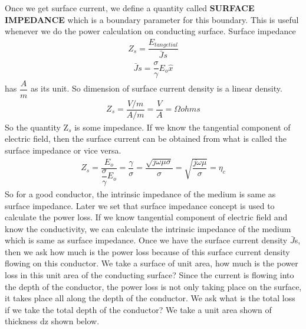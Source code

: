 Once we get surface current, we define a quantity called \textbf{SURFACE IMPEDANCE} which is a boundary parameter for this boundary. This is useful whenever we do the power calculation on conducting surface.
Surface impedance
\begin{align}
Z_{s}=\dfrac{E_{tangetial}}{\bar{J}s}
\end{align}
\begin{align}
\bar{J}s=\dfrac{\sigma}{\gamma}E_{o}\hat{x}
\end{align}
has $\dfrac{A}{m}$ as its unit. So dimension of surface current density is a linear density.
\begin{align}
Z_{s}=\dfrac{V/m}{A/m}=\dfrac{V}{A}=\Omega ohms
\end{align}
So the quantity Z$_{s}$ is some impedance. If we know the tangential component of electric field, then the surface current can be obtained from what is called the surface impedance or vice versa.
\begin{align}
Z_{s}=\dfrac{E_{o}}{\dfrac{\sigma}{\gamma} E_{o}}=\dfrac{\gamma}{\sigma}=\dfrac{\sqrt{j\omega\mu\sigma}}{\sigma}=\sqrt{\dfrac{j\omega\mu}{\sigma}}=\eta_{c}
\end{align}
So for a good conductor, the intrinsic impedance of the medium is same as surface impedance. Later we set that surface impedance concept is used to calculate the power loss. If we know tangential component of electric field and know the conductivity, we can calculate the intrinsic impedance of the medium which is same as surface impedance.
Once we have the surface current density $\bar{J}$s, then we ask how much is the power loss because of this surface current density flowing on this conductor. We take a surface of unit area, how much is the power loss in this unit area of the conducting surface? Since the current is flowing into the depth of the conductor, the power loss is not only taking place on the surface, it takes place all along the depth of the conductor. We ask what is the total loss if we take the total depth of the conductor? We take a unit area shown of thickness dz shown below.

